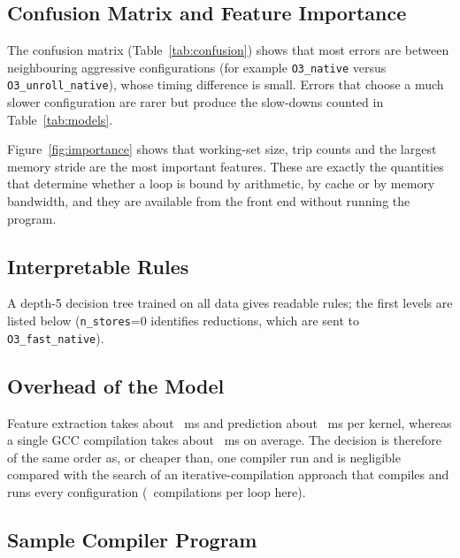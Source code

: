 \documentclass[12pt,a4paper]{article}
\begin{document}
\subsection{Confusion Matrix and Feature Importance}



The confusion matrix (Table~\ref{tab:confusion}) shows that most errors are between neighbouring
aggressive configurations (for example \texttt{O3\_native} versus \texttt{O3\_unroll\_native}), whose
timing difference is small. Errors that choose a much slower configuration are rarer but produce the
slow-downs counted in Table~\ref{tab:models}.



Figure~\ref{fig:importance} shows that working-set size, trip counts and the largest memory stride
are the most important features. These are exactly the quantities that determine whether a loop is
bound by arithmetic, by cache or by memory bandwidth, and they are available from the
front end without running the program.

\subsection{Interpretable Rules}

A depth-5 decision tree trained on all data gives readable rules; the first levels are listed below
(\texttt{n\_stores}=0 identifies reductions, which are sent to \texttt{O3\_fast\_native}).



\subsection{Overhead of the Model}

Feature extraction takes about \featMs\ ms and prediction about \predMs\ ms per kernel, whereas a
single GCC compilation takes about \gccCompileMs\ ms on average. The decision is therefore of the same
order as, or cheaper than, one compiler run and is negligible compared with the search of an
iterative-compilation approach that compiles and runs every configuration (\numConfigs\ compilations per loop here).

\subsection{Sample Compiler Program}
\end{document}

